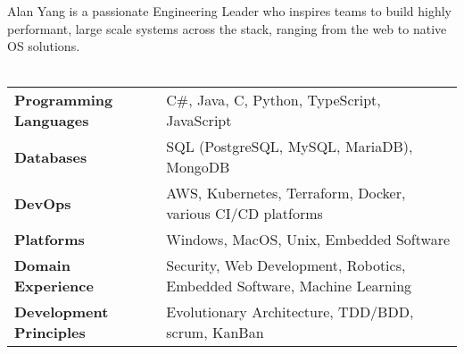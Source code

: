 \documentclass[line]{res}
\begin{document}
 


\begin{resume} 
Alan Yang is a passionate Engineering Leader who inspires teams to build highly performant, large scale systems across the stack, ranging from the web to native OS solutions. \\\\
\begin{tabular}{ l | p{13cm}}
{\bf Programming Languages} & C\#, Java, C, Python, TypeScript, JavaScript \\[1pt]
{\bf Databases} & SQL (PostgreSQL, MySQL, MariaDB), MongoDB \\[1pt]
{\bf DevOps} & AWS, Kubernetes, Terraform, Docker, various CI/CD platforms \\[1pt]
{\bf Platforms} & Windows, MacOS, Unix, Embedded Software \\[1pt]
{\bf Domain Experience } & Security, Web Development, Robotics, Embedded Software, Machine Learning  \\[1pt]
{\bf Development Principles} & Evolutionary Architecture, TDD/BDD, scrum, KanBan \\[1pt]
\end{tabular}

\vspace{0.1in} 

\end{resume}
\end{document}

